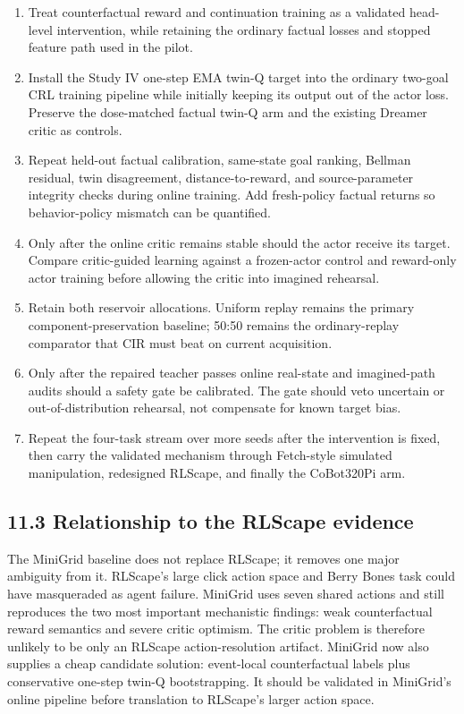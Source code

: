 \documentclass[10pt,a4paper]{article}
\newcommand{\reportsubsection}[1]{\subsection{\textcolor{brandblue}{#1}}}
\begin{document}
\begin{enumerate}
\item Treat counterfactual reward and continuation training as a validated head-level intervention, while retaining the ordinary factual losses and stopped feature path used in the pilot.
\item Install the Study IV one-step EMA twin-Q target into the ordinary two-goal CRL training pipeline while initially keeping its output out of the actor loss. Preserve the dose-matched factual twin-Q arm and the existing Dreamer critic as controls.
\item Repeat held-out factual calibration, same-state goal ranking, Bellman residual, twin disagreement, distance-to-reward, and source-parameter integrity checks during online training. Add fresh-policy factual returns so behavior-policy mismatch can be quantified.
\item Only after the online critic remains stable should the actor receive its target. Compare critic-guided learning against a frozen-actor control and reward-only actor training before allowing the critic into imagined rehearsal.
\item Retain both reservoir allocations. Uniform replay remains the primary component-preservation baseline; 50:50 remains the ordinary-replay comparator that CIR must beat on current acquisition.
\item Only after the repaired teacher passes online real-state and imagined-path audits should a safety gate be calibrated. The gate should veto uncertain or out-of-distribution rehearsal, not compensate for known target bias.
\item Repeat the four-task stream over more seeds after the intervention is fixed, then carry the validated mechanism through Fetch-style simulated manipulation, redesigned RLScape, and finally the CoBot320Pi arm.
\end{enumerate}
\begin{center}
\end{center}
\reportsubsection{11.3 Relationship to the RLScape evidence}
The MiniGrid baseline does not replace RLScape; it removes one major ambiguity from it. RLScape's large click action space and Berry Bones task could have masqueraded as agent failure. MiniGrid uses seven shared actions and still reproduces the two most important mechanistic findings: weak counterfactual reward semantics and severe critic optimism. The critic problem is therefore unlikely to be only an RLScape action-resolution artifact. MiniGrid now also supplies a cheap candidate solution: event-local counterfactual labels plus conservative one-step twin-Q bootstrapping. It should be validated in MiniGrid's online pipeline before translation to RLScape's larger action space.
\end{document}
